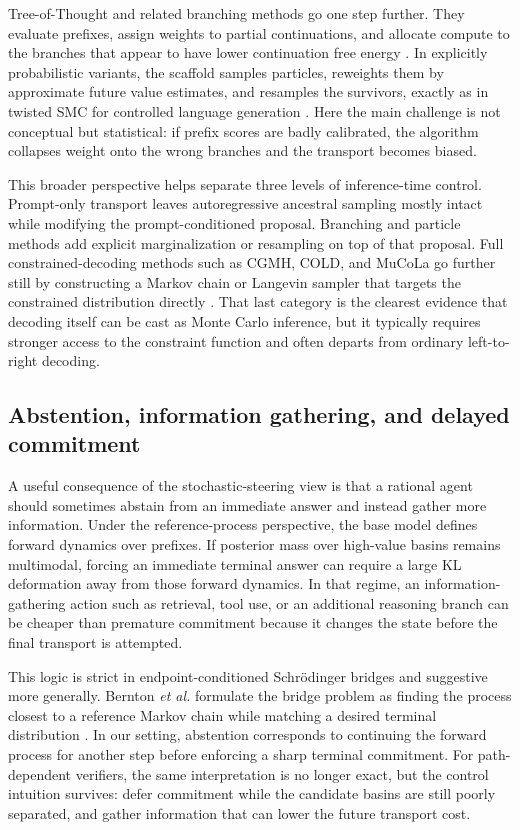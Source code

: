 \documentclass[aps,pre,reprint,superscriptaddress,nofootinbib]{revtex4-2}
\begin{document}
Tree-of-Thought and related branching methods go one step further.
 They evaluate prefixes, assign weights to partial continuations, and allocate compute to the branches that appear to have lower continuation free energy \cite{yao2023tree,mo2023uncertain,zhou2024lats}.
 In explicitly probabilistic variants, the scaffold samples particles, reweights them by approximate future value estimates, and resamples the survivors, exactly as in twisted SMC for controlled language generation \cite{zhao2024probabilistic,loula2025syntactic}.
 Here the main challenge is not conceptual but statistical: if prefix scores are badly calibrated, the algorithm collapses weight onto the wrong branches and the transport becomes biased.

This broader perspective helps separate three levels of inference-time control.
 Prompt-only transport leaves autoregressive ancestral sampling mostly intact while modifying the prompt-conditioned proposal.
 Branching and particle methods add explicit marginalization or resampling on top of that proposal.
 Full constrained-decoding methods such as CGMH, COLD, and MuCoLa go further still by constructing a Markov chain or Langevin sampler that targets the constrained distribution directly \cite{miao2019cgmh,qin2022cold,kumar2022gradient}.
 That last category is the clearest evidence that decoding itself can be cast as Monte Carlo inference, but it typically requires stronger access to the constraint function and often departs from ordinary left-to-right decoding.

\subsection{Abstention, information gathering, and delayed commitment}

A useful consequence of the stochastic-steering view is that a rational agent should sometimes abstain from an immediate answer and instead gather more information.
 Under the reference-process perspective, the base model defines forward dynamics over prefixes.
 If posterior mass over high-value basins remains multimodal, forcing an immediate terminal answer can require a large KL deformation away from those forward dynamics.
 In that regime, an information-gathering action such as retrieval, tool use, or an additional reasoning branch can be cheaper than premature commitment because it changes the state before the final transport is attempted.

This logic is strict in endpoint-conditioned Schr\"odinger bridges and suggestive more generally.
 Bernton \textit{et al.} formulate the bridge problem as finding the process closest to a reference Markov chain while matching a desired terminal distribution \cite{bernton2019schr}.
 In our setting, abstention corresponds to continuing the forward process for another step before enforcing a sharp terminal commitment.
 For path-dependent verifiers, the same interpretation is no longer exact, but the control intuition survives: defer commitment while the candidate basins are still poorly separated, and gather information that can lower the future transport cost.
\end{document}
